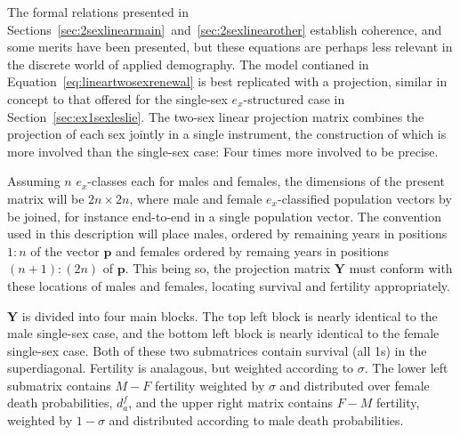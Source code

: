 
The formal relations presented in
Sections~\ref{sec:2sexlinearmain}~and~\ref{sec:2sexlinearother} establish
coherence, and some merits have been presented, but these equations are perhaps
less relevant in the discrete world of applied demography. The model contianed
in Equation~\ref{eq:lineartwosexrenewal} is best replicated with a projection,
similar in concept to that offered for the single-sex $e_x$-structured case in
Section~\ref{sec:ex1sexleslie}. The two-sex linear projection matrix combines
the projection of each sex jointly in a single instrument, the construction of 
which is more involved than the single-sex case: Four times more involved to be precise. 

Assuming $n$ $e_x$-classes each for males and females, the dimensions of the
present matrix will be $2n \times 2n$, where male and female
$e_x$-classified population vectors by be joined, for instance end-to-end in a
single population vector. The convention used in this description will place
males, ordered by remaining years in positions $1:n$ of the vector $\textbf{p}$
and females ordered by remaing years in positions $(n+1):(2n)$ of $\textbf{p}$.
This being so, the projection matrix $\textbf{Y}$ must conform with these
locations of males and females, locating survival and fertility appropriately.

$\textbf{Y}$ is divided into four main blocks. The top left block is
nearly identical to the male single-sex case, and the bottom left block is
nearly identical to the female single-sex case. Both of these two submatrices
contain survival (all 1s) in the superdiagonal. Fertility is analagous, but
weighted according to $\sigma$. The lower left submatrix contains $M-F$
fertility weighted by $\sigma$ and distributed over female death probabilities,
$d_a^f$, and the upper right matrix contains $F-M$ fertility, weighted by
$1-\sigma$ and distributed according to male death probabilities.

